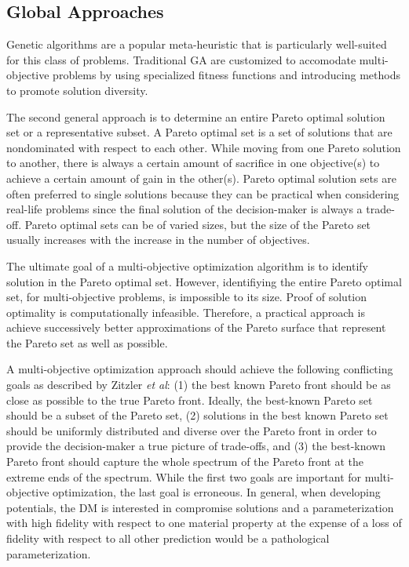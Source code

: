 \subsection{Global Approaches}

Genetic algorithms are a popular meta-heuristic that is particularly well-suited for this class of problems.  Traditional GA are customized to accomodate multi-objective problems by using specialized fitness functions and introducing methods to promote solution diversity.

The second general approach is to determine an entire Pareto optimal solution set or a representative subset. A Pareto optimal set is a set of solutions that are nondominated with respect to each other. While moving from one Pareto solution to another, there is always a certain amount of sacrifice in one objective(s) to achieve a certain amount of gain in the other(s). Pareto optimal solution sets are often preferred to single solutions because they can be practical when considering real-life problems since the final solution of the decision-maker is always a trade-off. Pareto optimal sets can be of varied sizes, but the size of the Pareto set usually increases with the increase in the number of objectives.

The ultimate goal of a multi-objective optimization algorithm is to identify solution in the Pareto optimal set.  However, identifiying the entire Pareto optimal set, for multi-objective problems, is impossible to its size.  Proof of solution optimality is computationally infeasible.  Therefore, a practical approach is achieve successively better approximations of the Pareto surface that represent the Pareto set as well as possible.

A multi-objective optimization approach should achieve the following conflicting goals as described by Zitzler \emph{et al}\cite{zitzler2000_moo_evolve}: (1) the best known Pareto front should be as close as possible to the true Pareto front.  Ideally, the best-known Pareto set should be a subset of the Pareto set, (2) solutions in the best known Pareto set should be uniformly distributed and diverse over the Pareto front in order to provide the decision-maker a true picture of trade-offs, and (3) the best-known Pareto front should capture the whole spectrum of the Pareto front at the extreme ends of the spectrum.  While the first two goals are important for multi-objective optimization, the last goal is erroneous.  In general, when developing potentials, the DM is interested in compromise solutions and a parameterization with high fidelity with respect to one material property at the expense of a loss of fidelity with respect to all other prediction would be a pathological parameterization.

